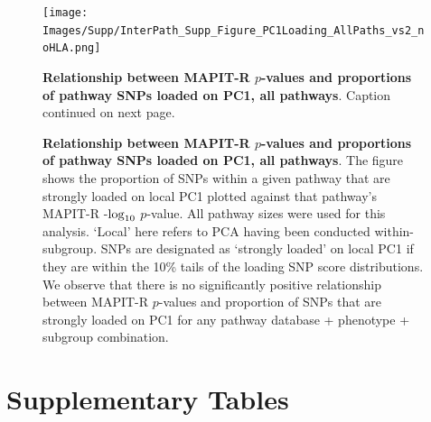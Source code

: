 \documentclass[12pt,a4paper]{article}
\def\log{{\rm log}}
\begin{document}
\setlength{\footskip}{3cm}
\begin{figure}[htbp]
\centering
\vspace*{-2cm}
\texttt{[image: Images/Supp/InterPath\_Supp\_Figure\_PC1Loading\_AllPaths\_vs2\_noHLA.png]}
\caption[TBD]{\textbf{Relationship between MAPIT-R $p$-values and proportions of pathway SNPs loaded on PC1, all pathways}. Caption continued on next page.}
\label{InterPath-Supp-Figure-PC1Loading-AllPaths}
\end{figure}
\clearpage
\setlength{\footskip}{1cm}

\addtocounter{figure}{-1}
\begin{figure} [t!]
  \caption{\textbf{Relationship between MAPIT-R $p$-values and proportions of pathway SNPs loaded on PC1, all pathways}. The figure shows the proportion of SNPs within a given pathway that are strongly loaded on local PC1 plotted against that pathway's MAPIT-R -$\log_{10}$ $p$-value. All pathway sizes were used for this analysis. `Local' here refers to PCA having been conducted within-subgroup. SNPs are designated as `strongly loaded' on local PC1 if they are within the 10\% tails of the loading SNP score distributions. We observe that there is no significantly positive relationship between MAPIT-R $p$-values and proportion of SNPs that are strongly loaded on PC1 for any pathway database + phenotype + subgroup combination.}
\label{InterPath-Supp-Figure-PC1Loading-AllPaths-Caption}
\end{figure}
\clearpage

\section{Supplementary Tables}\label{Supplementary-Tables}
\end{document}
